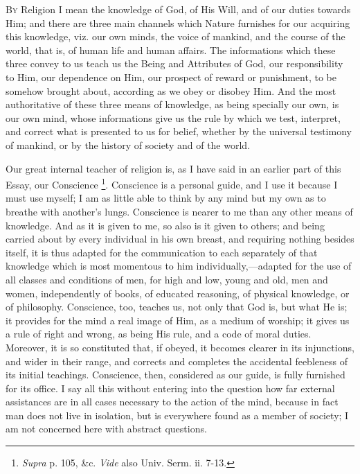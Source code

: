 
B\textsc{y} Religion I mean the knowledge of God, of His Will, and of our
duties towards Him; and there are three main channels which Nature
furnishes for our acquiring this knowledge, viz. our own minds, the
voice of mankind, and the course of the world, that is, of human life
and human affairs. The informations which these three convey to us
teach us the Being and Attributes of God, our responsibility to Him,
our dependence on Him, our prospect of reward or punishment, to be
somehow brought about, according as we obey or disobey Him. And the
most authoritative of these three means of knowledge, as being
specially our own, is our own mind, whose informations give us the
rule by which we test, interpret, and correct what is presented to us
for belief, whether by the universal testimony of mankind, or by the
history of society and of the world.

Our great internal teacher of religion is, as I have said in an
earlier part of this Essay, our Conscience \footnote{\emph{Supra} p. 105, \&c. \emph{Vide} also Univ.
Serm. ii.
7-13.}. Conscience is a personal guide, and I use it because I must
use myself; I am as little able to think by any mind but my own
as to breathe with another's lungs. Conscience is nearer to me than
any other means of knowledge. And as it is given to me, so also is it
given to others; and being carried about by every individual in his
own breast, and requiring nothing besides itself, it is thus adapted
for the communication to each separately of that knowledge which is
most momentous to him individually,—adapted for the use of all
classes and conditions of men, for high and low, young and old, men
and women, independently of books, of educated reasoning, of physical
knowledge, or of philosophy. Conscience, too, teaches us, not only
that God is, but what He is; it provides for the mind a real image of
Him, as a medium of worship; it gives us a rule of right and wrong, as
being His rule, and a code of moral duties. Moreover, it is so
constituted that, if obeyed, it becomes clearer in its injunctions,
and wider in their range, and corrects and completes the accidental
feebleness of its initial teachings. Conscience, then, considered as
our guide, is fully furnished for its office. I say all this without
entering into the question how far external assistances are in all
cases necessary to the action of the mind, because in fact man does
not live in isolation, but is everywhere found as a member of society;
I am not concerned here with abstract questions.

